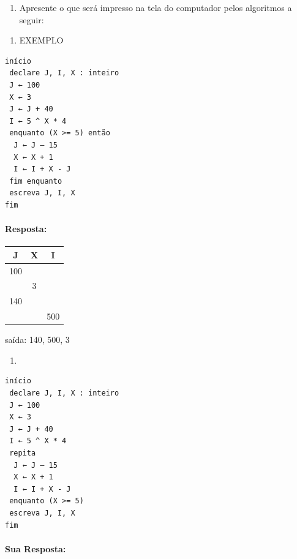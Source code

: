 \documentclass[12pt,a4paper]{article}
\providecommand{\tightlist}{%
      \setlength{\itemsep}{0pt}\setlength{\parskip}{0pt}}
\begin{document}
\begin{enumerate}
\def\labelenumi{\arabic{enumi}.}
\setcounter{enumi}{3}
\tightlist
\item
  Apresente o que será impresso na tela do computador pelos algoritmos a
  seguir:
\end{enumerate}

\begin{enumerate}
\def\labelenumi{\alph{enumi})}
\tightlist
\item
  EXEMPLO
\end{enumerate}

\begin{verbatim}
início
 declare J, I, X : inteiro
 J ← 100
 X ← 3
 J ← J + 40
 I ← 5 ^ X * 4
 enquanto (X >= 5) então
  J ← J – 15
  X ← X + 1
  I ← I + X - J
 fim enquanto
 escreva J, I, X
fim 
\end{verbatim}

    \hypertarget{resposta}{%
\paragraph{Resposta:}\label{resposta}}

\begin{longtable}[]{@{}ccc@{}}
\toprule()
J & X & I \\
\midrule()
\endhead
100 & & \\
& 3 & \\
140 & & \\
& & 500 \\
\bottomrule()
\end{longtable}

saída: 140, 500, 3

    \begin{enumerate}
\def\labelenumi{\alph{enumi})}
\setcounter{enumi}{1}
\tightlist
\item
\end{enumerate}

\begin{verbatim}
início
 declare J, I, X : inteiro
 J ← 100
 X ← 3
 J ← J + 40
 I ← 5 ^ X * 4
 repita
  J ← J – 15
  X ← X + 1
  I ← I + X - J
 enquanto (X >= 5)
 escreva J, I, X
fim
\end{verbatim}

    \hypertarget{sua-resposta}{%
\paragraph{Sua Resposta:}\label{sua-resposta}}
\end{document}
